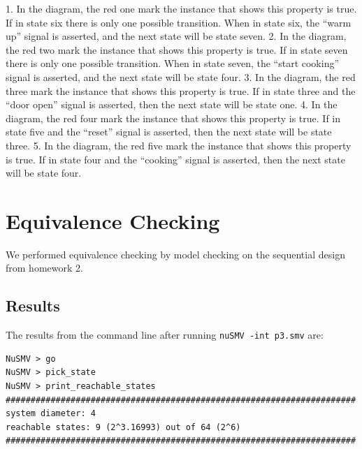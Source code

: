 \documentclass[11pt]{article}
\begin{document}
1. In the diagram, the red one mark the instance that shows this property is true. If in state six there is only one possible transition. When in state six, the “warm up” signal is asserted, and the next state will be state seven.
2. In the diagram, the red two mark the instance that shows this property is true. If in state seven there is only one possible transition. When in state seven, the “start cooking” signal is asserted, and the next state will be state four.
3. In the diagram, the red three mark the instance that shows this property is true. If in state three and the “door open” signal is asserted, then the next state will be state one.
4. In the diagram, the red four mark the instance that shows this property is true.  If in state five and the “reset” signal is asserted, then the next state will be state three.
5. In the diagram, the red five mark the instance that shows this property is true.  If in state four and the “cooking” signal is asserted, then the next state will be state four.
	
	

%

\section{Equivalence Checking} 
We performed equivalence checking by model checking on the sequential design from homework 2.
\subsection{Results}

The results from the command line after running \texttt{nuSMV -int p3.smv} are:
 \begin{lstlisting}[caption=NuSMV Interactive Output, label=p3_out]	
NuSMV > go
NuSMV > pick_state
NuSMV > print_reachable_states
######################################################################
system diameter: 4
reachable states: 9 (2^3.16993) out of 64 (2^6)
######################################################################
\end{lstlisting}



%  
\end{document}
